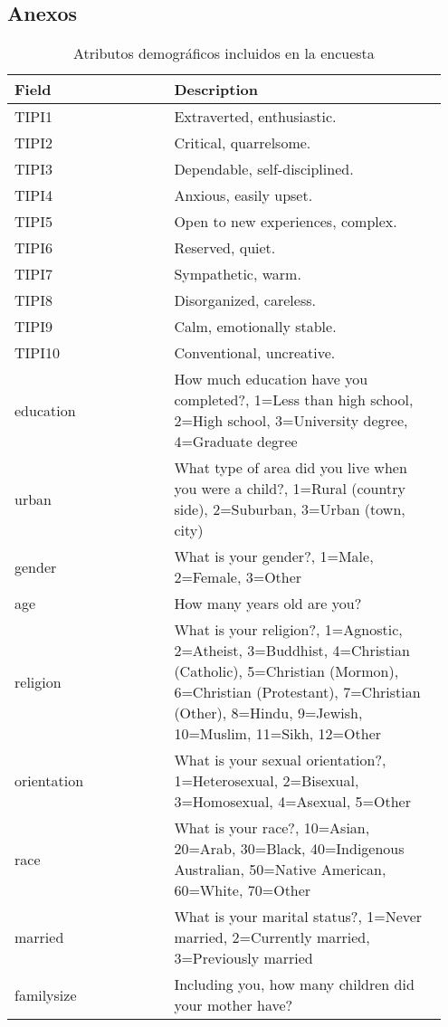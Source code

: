 \begin{appendices}
\section{Anexos}

\begin{table}[ht]
\centering
\caption{Atributos demográficos incluidos en la encuesta}
\begin{tabular}{p{0.35\linewidth} | p{0.6\linewidth}}
\toprule
      Field &                                                                                                                                                                                             Description \\
\midrule
TIPI1 & Extraverted, enthusiastic. \\
TIPI2 & Critical, quarrelsome. \\
TIPI3 & Dependable, self-disciplined. \\
TIPI4 & Anxious, easily upset. \\
TIPI5 & Open to new experiences, complex. \\
TIPI6 & Reserved, quiet. \\
TIPI7 & Sympathetic, warm. \\
TIPI8 & Disorganized, careless. \\
TIPI9 & Calm, emotionally stable. \\
TIPI10 & Conventional, uncreative. \\
education & How much education have you completed?, 1=Less than high school, 2=High school, 3=University degree, 4=Graduate degree \\
urban & What type of area did you live when you were a child?, 1=Rural (country side), 2=Suburban, 3=Urban (town, city) \\
gender & What is your gender?, 1=Male, 2=Female, 3=Other \\
age & How many years old are you? \\
religion & What is your religion?, 1=Agnostic, 2=Atheist, 3=Buddhist, 4=Christian (Catholic), 5=Christian (Mormon), 6=Christian (Protestant), 7=Christian (Other), 8=Hindu, 9=Jewish, 10=Muslim, 11=Sikh, 12=Other \\
orientation & What is your sexual orientation?, 1=Heterosexual, 2=Bisexual, 3=Homosexual, 4=Asexual, 5=Other \\
race & What is your race?, 10=Asian, 20=Arab, 30=Black, 40=Indigenous Australian, 50=Native American, 60=White, 70=Other \\
married & What is your marital status?, 1=Never married, 2=Currently married, 3=Previously married \\
familysize & Including you, how many children did your mother have? \\
\bottomrule
\end{tabular}
\label{table:demographic_questions}
\end{table}%


\end{appendices}
